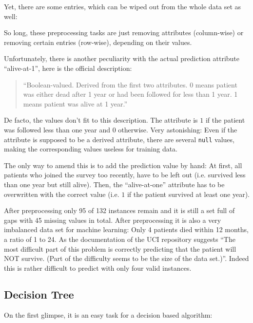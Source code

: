 \documentclass[paper=a4, fontsize=11pt]{scrartcl} %
\numberwithin{equation}{section} %
\numberwithin{figure}{section} %
\numberwithin{table}{section} %
\begin{document}
Yet, there are some entries, which can be wiped out from the whole data set as well:


So long, these preprocessing tasks are just removing attributes (column-wise) or removing certain entries (row-wise), depending on their values.

Unfortunately, there is another peculiarity with the actual prediction attribute ``alive-at-1'', here is the official description:
\begin{quotation} ``Boolean-valued. Derived from the first two attributes. 0 means patient was either dead after 1 year or had been followed for less than 1 year.  1 means patient was alive at 1 year.''\cite{uci-repo} \end{quotation}
De facto, the values don't fit to this description. The attribute is $1$ if the patient was followed less than one year and $0$ otherwise. Very astonishing: Even if the attribute is supposed to be a derived attribute, there are several \texttt{null} values, making the corresponding values useless for training data.                                                                

The only way to amend this is to add the prediction value by hand: At first, all patients who joined the survey too recently, have to be left out (i.e. survived less than one year but still alive). Then, the ``alive-at-one'' attribute has to be overwritten with the correct value (i.e. $1$ if the patient survived at least one year).

After preprocessing only 95 of 132 instances remain and it is still a set full of gaps with 45 missing values in total. After preprocessing it is also a very imbalanced data set for machine learning: Only 4 patients died within 12 months, a ratio of 1 to 24. As the documentation of the UCI repository suggests ``The most difficult part of this problem is correctly predicting that the patient will NOT survive. (Part of the difficulty seems to be the size of the data set.)''\cite{uci-repo}. Indeed this is rather difficult to predict with only four valid instances. 

\subsection{Decision Tree}
On the first glimpse, it is an easy task for a decision based algorithm:
\end{document}
